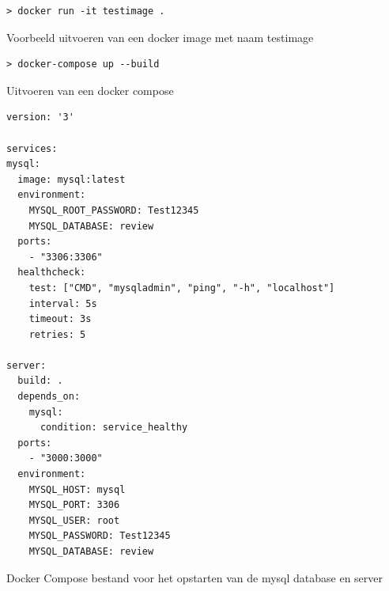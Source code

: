 \begin{listing}[H]
  \centering
  \begin{verbatim}
> docker run -it testimage .
      \end{verbatim}
      \caption{\label{code:dockerrun}Voorbeeld uitvoeren van een docker image met naam testimage}
\end{listing}

\begin{listing}[H]
  \centering
  \begin{verbatim}
> docker-compose up --build
      \end{verbatim}
      \caption{\label{code:dockercompose}Uitvoeren van een docker compose}
\end{listing}
\begin{listing}[H]
  \centering
  \begin{verbatim}
version: '3'

services:
mysql:
  image: mysql:latest
  environment:
    MYSQL_ROOT_PASSWORD: Test12345
    MYSQL_DATABASE: review
  ports:
    - "3306:3306"
  healthcheck:
    test: ["CMD", "mysqladmin", "ping", "-h", "localhost"]
    interval: 5s
    timeout: 3s
    retries: 5

server:
  build: .
  depends_on:
    mysql:
      condition: service_healthy
  ports:
    - "3000:3000"
  environment:
    MYSQL_HOST: mysql
    MYSQL_PORT: 3306
    MYSQL_USER: root
    MYSQL_PASSWORD: Test12345
    MYSQL_DATABASE: review
      \end{verbatim}
      \caption{\label{code:dockercompose}Docker Compose bestand voor het opstarten van de mysql database en server}
\end{listing}

